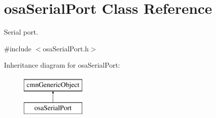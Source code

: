 \hypertarget{classosa_serial_port}{\section{osa\-Serial\-Port Class Reference}
\label{classosa_serial_port}
}


Serial port.  




{\ttfamily \#include $<$osa\-Serial\-Port.\-h$>$}

Inheritance diagram for osa\-Serial\-Port\-:\begin{figure}[H]
\begin{center}
\leavevmode
\includegraphics[height=2.000000cm]{d3/d6d/classosa_serial_port}
\end{center}
\end{figure}
